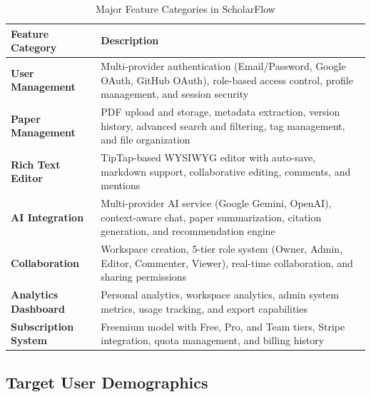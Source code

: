 \begin{table}[H]
    \centering
    \begin{tabularx}{\textwidth}{|l|X|}
        \hline
        \textbf{Feature Category}    & \textbf{Description}                                                                                             \\
        \hline
        \textbf{User Management}     &
        Multi-provider authentication (Email/Password, Google OAuth, GitHub OAuth), role-based access control, profile management, and session security \\
        \hline
        \textbf{Paper Management}    &
        PDF upload and storage, metadata extraction, version history, advanced search and filtering, tag management, and file organization              \\
        \hline
        \textbf{Rich Text Editor}    &
        TipTap-based WYSIWYG editor with auto-save, markdown support, collaborative editing, comments, and mentions                                     \\
        \hline
        \textbf{AI Integration}      &
        Multi-provider AI service (Google Gemini, OpenAI), context-aware chat, paper summarization, citation generation, and recommendation engine      \\
        \hline
        \textbf{Collaboration}       &
        Workspace creation, 5-tier role system (Owner, Admin, Editor, Commenter, Viewer), real-time collaboration, and sharing permissions              \\
        \hline
        \textbf{Analytics Dashboard} &
        Personal analytics, workspace analytics, admin system metrics, usage tracking, and export capabilities                                          \\
        \hline
        \textbf{Subscription System} &
        Freemium model with Free, Pro, and Team tiers, Stripe integration, quota management, and billing history                                        \\
        \hline
    \end{tabularx}
    \caption{Major Feature Categories in ScholarFlow}
    \label{table:feature-categories}
\end{table}

\subsection{Target User Demographics}

